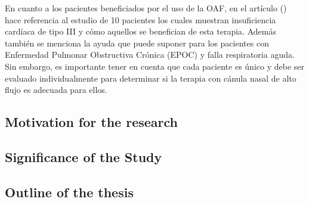 En cuanto a los pacientes beneficiados por el uso de la OAF, en el artículo (\cite{Lodeserto2018}) hace referencia al estudio de 10 pacientes los cuales muestran insuficiencia cardíaca de tipo III y cómo aquellos se benefician de esta terapia. Además también se menciona la ayuda que puede suponer para los pacientes con Enfermedad Pulmonar Obstructiva Crónica (EPOC) y falla respiratoria aguda. Sin embargo, es importante tener en cuenta que cada paciente es único y debe ser evaluado individualmente para determinar si la terapia con cánula nasal de alto flujo es adecuada para ellos.



\subsection{Motivation for the research}

\subsection{Significance of the Study}


\subsection{Outline of the thesis}


